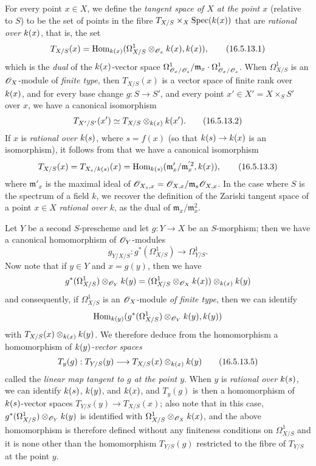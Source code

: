 \begin{env}[16.5.13]
\label{IV.16.5.13}
For every point $x \in X$, we define the \emph{tangent space of $X$ at the point $x$} (relative to $S$) to be the set of points in the fibre $T_{X/S} \times_X \operatorname{Spec}(k(x))$ that are \emph{rational over $k(x)$}, that is, the set
\[
\label{IV.16.5.13.1}
  T_{X/S}(x) = \operatorname{Hom}_{k(x)}(\Omega_{X/S}^1 \otimes_{\mathscr{O}_x} k(x), k(x)),
  \tag{16.5.13.1}
\]
which is the \emph{dual} of the $k(x)$-vector space $\Omega_{\mathscr{O}_x/\mathscr{O}_s}^1/\mathfrak{m}_x \cdot \Omega_{\mathscr{O}_x/\mathscr{O}_s}^1$.
When $\Omega_{X/S}^1$ is an $\mathscr{O}_X$-module of \emph{finite type}, then $T_{X/S}(x)$ is a vector space of finite rank over $k(x)$, and for every base change
$g : S \to S'$, and every point $x' \in X' = X \times_S S'$ over $x$, we have a canonical isomorphism
\[
  \label{IV.16.5.13.2}
  T_{X'/S'}(x') \simeq T_{X/S} \otimes_{k(x)} k(x').
  \tag{16.5.13.2}
\]
If $x$ is \emph{rational over $k(s)$}, where $s = f(x)$ (so that $\kres(s) \to \kres(x)$ is an isomorphism), it follows from  that we have a canonical isomorphism
\[
\label{IV.16.5.13.3}
  T_{X/S}(x) = T_{X_s/k(s)}(x) = \operatorname{Hom}_{k(s)}(\mathfrak{m}'_x/\mathfrak{m}_x^{'2}, k(x)),
  \tag{16.5.13.3}
\]
where $\mathfrak{m}'_x$ is the maximal ideal of $\mathscr{O}_{X_s,x} = \mathscr{O}_{X, x}/\mathfrak{m}_s \mathscr{O}_{X,x}$.
In the case where $S$ is the spectrum of a field $k$, we recover the definition of the Zariski tangent space of a point $x \in X$ \emph{rational over $k$}, as the dual of $\mathfrak{m}_x / \mathfrak{m}_x^2$.

Let $Y$ be a second $S$-prescheme and let $g : Y \to X$ be an $S$-morphism;
then we have a canonical homomorphism of $\mathscr{O}_Y$-modules 
\[
\label{IV.16.5.13.4}
  g_{Y/X/S} : g^*(\Omega_{X/S}^1) \to \Omega_{Y/S}^1.
  \tag{16.5.13.4}
\]
Now note that if $y \in Y$ and $x = g(y)$, then we have
\[
  g^*(\Omega_{X/S}^1) \otimes_{\mathscr{O}_Y} k(y) = (\Omega_{X/S}^1 \otimes_{\mathscr{O}_X} k(x)) \otimes_{k(x)} k(y) 
\]
and consequently, if $\Omega_{X/S}^1$ is an $\mathscr{O}_X$-module \emph{of finite type}, then we can identify
\[
  \operatorname{Hom}_{k(y)}(g^*(\Omega_{X/S}^1) \otimes_{\mathscr{O}_Y} k(y), k(y))
\]
with $T_{X/S}(x) \otimes_{k(x)} k(y)$.
We therefore deduce from the homomorphism  a homomorphism of \emph{$k(y)$-vector spaces}
\[
\label{IV.16.5.13.5}
  T_y(g) : T_{Y/S}(y) \to T_{X/S}(x) \otimes_{\kres(x)} \kres(y)
  \tag{16.5.13.5}
\]
called the \emph{linear map tangent to $g$ at the point $y$}.
When $y$ is \emph{rational over $k(s)$}, we can identify $k(s)$, $k(y)$, and $k(x)$, and $T_y(g)$ is then a homomorphism of $k(s)$-vector spaces $T_{Y/S}(y) \to T_{X/S}(x)$;
also note that in this case, $g^*(\Omega_{X/S}^1) \otimes_{\mathscr{O}_Y} k(y)$ is identified with $\Omega_{X/S}^1 \otimes_{\mathscr{O}_X} k(x)$, and the above homomorphism is therefore defined without any finiteness conditions on $\Omega_{X/S}^1$ and it is none other than the homomorphism $T_{Y/S}(g)$  restricted to the fibre of $T_{Y/S}$ at the point $y$.
\end{env}

